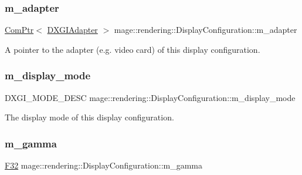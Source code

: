 \subsubsection{\texorpdfstring{m\+\_\+adapter}{m\_adapter}}
{\footnotesize\ttfamily \hyperlink{namespacemage_ae74f374780900893caa5555d1031fd79}{Com\+Ptr}$<$ \hyperlink{namespacemage_1_1rendering_ad55e028ebd705b547eeb972ad8d03b6a}{D\+X\+G\+I\+Adapter} $>$ mage\+::rendering\+::\+Display\+Configuration\+::m\+\_\+adapter\hspace{0.3cm}{\ttfamily [private]}}

A pointer to the adapter (e.\+g. video card) of this display configuration. \hypertarget{classmage_1_1rendering_1_1_display_configuration_a577ada006ada1b1e65a8deb817f0dafe}{}\label{classmage_1_1rendering_1_1_display_configuration_a577ada006ada1b1e65a8deb817f0dafe} 
\subsubsection{\texorpdfstring{m\+\_\+display\+\_\+mode}{m\_display\_mode}}
{\footnotesize\ttfamily D\+X\+G\+I\+\_\+\+M\+O\+D\+E\+\_\+\+D\+E\+SC mage\+::rendering\+::\+Display\+Configuration\+::m\+\_\+display\+\_\+mode\hspace{0.3cm}{\ttfamily [private]}}

The display mode of this display configuration. \hypertarget{classmage_1_1rendering_1_1_display_configuration_ac01844bb757c13e438c9ef3281becd4e}{}\label{classmage_1_1rendering_1_1_display_configuration_ac01844bb757c13e438c9ef3281becd4e} 
\subsubsection{\texorpdfstring{m\+\_\+gamma}{m\_gamma}}
{\footnotesize\ttfamily \hyperlink{namespacemage_aa97e833b45f06d60a0a9c4fc22ae02c0}{F32} mage\+::rendering\+::\+Display\+Configuration\+::m\+\_\+gamma\hspace{0.3cm}{\ttfamily [private]}}


